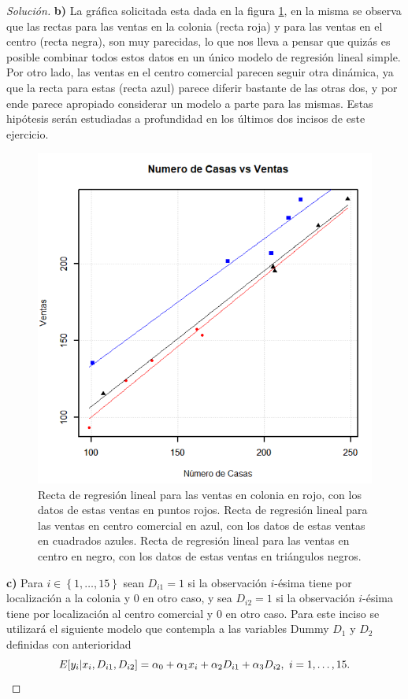 \documentclass[10.5pt,notitlepage]{article}
\newenvironment{solucion}
  {\begin{proof}[Solución]}
  {\end{proof}}
\newcommand{\kis}[1]{\left\{ #1 \right\}}
\theoremstyle{plain}
\begin{document}
\begin{solucion}
\noindent \textbf{b)} La gráfica solicitada esta dada en la figura \ref{fig:18}, en la misma se observa que las rectas para las ventas en la colonia (recta roja) y para las ventas en el centro (recta negra), son muy parecidas, lo que nos lleva a pensar que quizás es posible combinar todos estos datos en un único modelo de regresión lineal simple. Por otro lado, las ventas en el centro comercial parecen seguir otra dinámica, ya que la recta para estas (recta azul) parece diferir bastante de las otras dos, y por ende parece apropiado considerar un modelo a parte para las mismas. Estas hipótesis serán estudiadas a profundidad en los últimos dos incisos de este ejercicio.\\

\begin{figure}[htb]
 \centering
 \includegraphics[scale = 0.65]{Ejercicio 4 Imagen 1 gráfico.png}
 \caption{Recta de regresión lineal para las ventas en colonia en rojo, con los datos de estas ventas en puntos rojos. Recta de regresión lineal para las ventas en centro comercial en azul, con los datos de estas ventas en cuadrados azules. Recta de regresión lineal para las ventas en centro en negro, con los datos de estas ventas en triángulos negros.}
\label{fig:18}
\end{figure}

\noindent \textbf{c)} Para \(i \in \kis{1, \hdots,15}\) sean \(D_{i1} = 1\) si la observación \(i\)-ésima tiene por localización a la colonia y \(0\) en otro caso, y sea \(D_{i2} = 1\) si la observación \(i\)-ésima tiene por localización al centro comercial y \(0\) en otro caso. Para este inciso se utilizará el siguiente modelo que contempla a las variables Dummy \(D_{1}\) y \(D_{2}\) definidas con anterioridad
\begin{equation}\label{Dummies 1}
     E[y_i | x_i, D_{i1}, D_{i2}] = \alpha_{0} + \alpha_{1}x_{i} + \alpha_{2}D_{i1} + \alpha_{3}D_{i2}, \ i = 1, \hdots, 15.\\ 
\end{equation}


\end{solucion}
\end{document}
